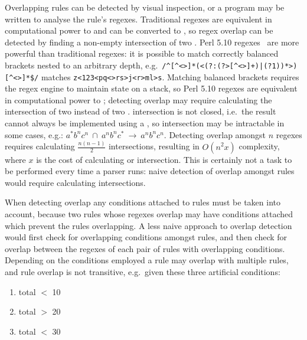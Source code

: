 Overlapping rules can be detected by visual inspection, or a program may be
written to analyse the rule's regexes.  Traditional regexes are equivalent
in computational power to  and can be converted to
, so regex overlap can be detected by finding a non-empty
intersection of two \@.  Perl 5.10 regexes~\cite{perlre} are
more powerful than traditional regexes: it is possible to match correctly
balanced brackets nested to an arbitrary depth, e.g.\
\verb!/^[^<>]*(<(?:(?>[^<>]+)|(?1))*>)[^<>]*$/!  matches
\verb!z<123<pq<>rs>j<r>ml>s!.  Matching balanced brackets requires the
regex engine to maintain state on a stack, so Perl 5.10 regexes are
equivalent in computational power to ; detecting overlap may
require calculating the intersection of two  instead of two
\acronym{FA}.   intersection is not closed, i.e.\ the result
cannot always be implemented using a \acronym{PDA}, so intersection may be
intractable in some cases, e.g.:
$a^{*}b^{n}c^{n}~\cap~a^{n}b^{n}c^{*}~\rightarrow~a^{n}b^{n}c^{n}$.
Detecting overlap amongst $n$ regexes requires calculating
$\frac{n\left(n-1\right)}{2}$ intersections, resulting in
$O\left(n^{2}x\right)$ complexity, where $x$ is the cost of calculating
\acronym{FA} or \acronym{PDA} intersection.  This is certainly not a task
to be performed every time a parser runs: naive detection of overlap
amongst \parsernames{} \numberOFrules{} rules would require calculating
\numberOFruleINTERSECTIONS{} intersections.

When detecting overlap any conditions attached to rules must be taken into
account, because two rules whose regexes overlap may have conditions
attached which prevent the rules overlapping.  A less naive approach to
overlap detection would first check for overlapping conditions amongst
rules, and then check for overlap between the regexes of each pair of rules
with overlapping conditions.  Depending on the conditions employed a rule
may overlap with multiple rules, and rule overlap is not transitive, e.g.\
given these three artificial conditions:

\begin{enumerate}

    \squeezeitems{}

    \item total $<$ 10

    \item total $>$ 20

    \item total $<$ 30

\end{enumerate}

